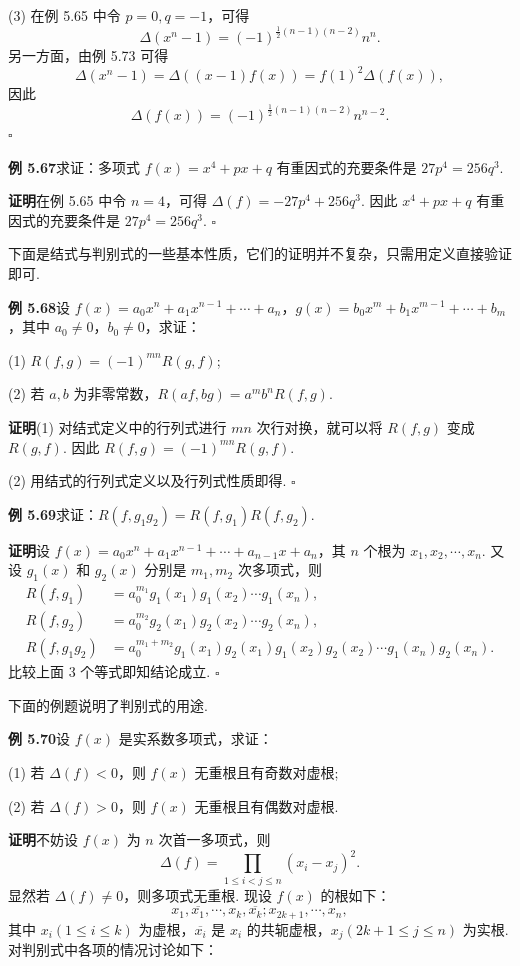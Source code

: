 \documentclass[UTF8,12pt,a4paper,fontset=fandol]{ctexart}
\begin{document}
(3) 在例 5.65 中令 $p=0,q=-1$，可得
\[
\Delta(x^n-1)=(-1)^{\frac12(n-1)(n-2)}n^n.
\]
另一方面，由例 5.73 可得
\[
\Delta(x^n-1)=\Delta((x-1)f(x))=f(1)^2\Delta(f(x)),
\]
因此
\[
\Delta(f(x))=(-1)^{\frac12(n-1)(n-2)}n^{n-2}.
\]
\hfill $\square$

\noindent\textbf{例 5.67}\quad 求证：多项式 $f(x)=x^4+px+q$ 有重因式的充要条件是 $27p^4=256q^3$.

\noindent\textbf{证明}\quad 在例 5.65 中令 $n=4$，可得 $\Delta(f)=-27p^4+256q^3$. 因此 $x^4+px+q$ 有重因式的充要条件是 $27p^4=256q^3$. \hfill $\square$

下面是结式与判别式的一些基本性质，它们的证明并不复杂，只需用定义直接验证即可.

\noindent\textbf{例 5.68}\quad 设 $f(x)=a_0x^n+a_1x^{n-1}+\cdots+a_n$，$g(x)=b_0x^m+b_1x^{m-1}+\cdots+b_m$，其中 $a_0\ne0$，$b_0\ne0$，求证：

(1) $R(f,g)=(-1)^{mn}R(g,f)$;

(2) 若 $a,b$ 为非零常数，$R(af,bg)=a^mb^nR(f,g)$.

\noindent\textbf{证明}\quad (1) 对结式定义中的行列式进行 $mn$ 次行对换，就可以将 $R(f,g)$ 变成 $R(g,f)$. 因此 $R(f,g)=(-1)^{mn}R(g,f)$.

(2) 用结式的行列式定义以及行列式性质即得. \hfill $\square$

\noindent\textbf{例 5.69}\quad 求证：$R(f,g_1g_2)=R(f,g_1)R(f,g_2)$.

\noindent\textbf{证明}\quad 设 $f(x)=a_0x^n+a_1x^{n-1}+\cdots+a_{n-1}x+a_n$，其 $n$ 个根为 $x_1,x_2,\cdots,x_n$. 又设 $g_1(x)$ 和 $g_2(x)$ 分别是 $m_1,m_2$ 次多项式，则
\[
\begin{aligned}
R(f,g_1)&=a_0^{m_1}g_1(x_1)g_1(x_2)\cdots g_1(x_n),\\
R(f,g_2)&=a_0^{m_2}g_2(x_1)g_2(x_2)\cdots g_2(x_n),\\
R(f,g_1g_2)&=a_0^{m_1+m_2}g_1(x_1)g_2(x_1)g_1(x_2)g_2(x_2)\cdots g_1(x_n)g_2(x_n).
\end{aligned}
\]
比较上面 3 个等式即知结论成立. \hfill $\square$

下面的例题说明了判别式的用途.

\noindent\textbf{例 5.70}\quad 设 $f(x)$ 是实系数多项式，求证：

(1) 若 $\Delta(f)<0$，则 $f(x)$ 无重根且有奇数对虚根;

(2) 若 $\Delta(f)>0$，则 $f(x)$ 无重根且有偶数对虚根.

\noindent\textbf{证明}\quad 不妨设 $f(x)$ 为 $n$ 次首一多项式，则
\[
\Delta(f)=\prod_{1\le i<j\le n}(x_i-x_j)^2.
\]
显然若 $\Delta(f)\ne0$，则多项式无重根. 现设 $f(x)$ 的根如下：
\[
x_1,\overline{x_1},\cdots,x_k,\overline{x_k};x_{2k+1},\cdots,x_n,
\]
其中 $x_i(1\le i\le k)$ 为虚根，$\overline{x_i}$ 是 $x_i$ 的共轭虚根，$x_j(2k+1\le j\le n)$ 为实根. 对判别式中各项的情况讨论如下：
\end{document}
